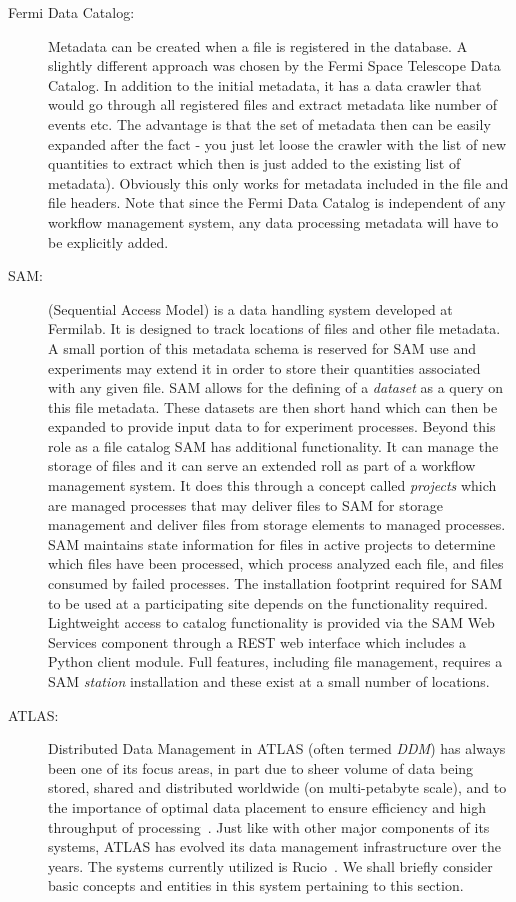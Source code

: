 \begin{description}
\item[Fermi Data Catalog:] Metadata can be created when a file is registered in the database. A slightly
different approach was chosen by the Fermi Space Telescope Data Catalog. In addition to the initial metadata, it has a
data crawler that would go through all registered files and extract metadata like number of events etc. The advantage is
that the set of metadata then can be easily expanded after the fact - you just let loose the crawler with the list
of new quantities to extract which then is just added to the existing list of metadata). Obviously this only works for 
metadata included in the file and file headers.  Note that since the Fermi Data Catalog is independent of any
workflow management system, any data processing metadata will have to be explicitly added. 


\item[SAM:] (Sequential Access Model) is a data handling system
  developed at Fermilab.  It is designed to track locations of files
  and other file metadata.  A small portion of this metadata schema is
  reserved for SAM use and experiments may extend it in order to store
  their quantities associated with any given file.  SAM allows for the
  defining of a \textit{dataset} as a query on this file metadata.
  These datasets are then short hand which can then be expanded to
  provide input data to for experiment processes.  Beyond this role as
  a file catalog SAM has additional functionality.  It can manage the
  storage of files and it can serve an extended roll as part of a workflow
  management system.  It does this through a concept called
  \textit{projects} which are managed processes that may deliver files
  to SAM for storage management and deliver files from storage elements
  to managed processes. SAM maintains state information for files in
  active projects to determine which files have been processed, which process
  analyzed each file, and files consumed by failed processes. The installation footprint required
  for SAM to be used at a participating site depends on the
  functionality required.  Lightweight access to catalog functionality
  is provided via the SAM Web Services component through a REST web
  interface which includes a Python client module.  Full features,
  including file management, requires a SAM \textit{station}
  installation and these exist at a small number of locations.

\item[ATLAS:] Distributed Data Management in ATLAS (often termed \textit{DDM}) has always been one of its focus areas, in part due to sheer volume of
data being stored, shared and distributed worldwide (on multi-petabyte scale), and to the importance of optimal data placement to ensure efficiency
and high throughput of processing~\cite{atlas_ddm_chep12}. Just like with other major components of its systems, ATLAS has evolved its
data management infrastructure over the years. The systems currently utilized is Rucio~\cite{rucio_chep13}. We shall briefly consider basic
concepts and entities in this system pertaining to this section.


\end{description}
